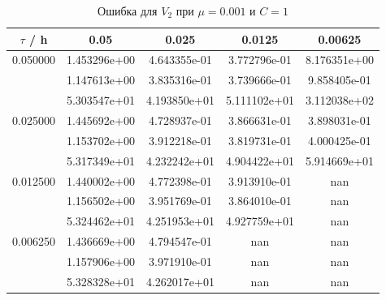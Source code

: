 \documentclass[specialist,subf,href,colorlinks=true,12pt
,times,mtpro,specialist
]{disser}
\begin{document}
\begin{table}[H]
\small
\caption{Ошибка для $V_2$ при $\mu=0.001$ и $C = 1$}
\begin{center}
\begin{tabular}{|c|c|c|c|c|}
\hline
$\tau$ / h & 0.05 & 0.025 & 0.0125 & 0.00625 \\
\hline
0.050000 & 1.453296e+00  & 4.643355e-01  & 3.772796e-01  & 8.176351e+00 \\
 & 1.147613e+00  & 3.835316e-01  & 3.739666e-01  & 9.858405e-01 \\
 & 5.303547e+01  & 4.193850e+01  & 5.111102e+01  & 3.112038e+02 \\
\hline
0.025000 & 1.445692e+00  & 4.728937e-01  & 3.866631e-01  & 3.898031e-01 \\
 & 1.153702e+00  & 3.912218e-01  & 3.819731e-01  & 4.000425e-01 \\
 & 5.317349e+01  & 4.232242e+01  & 4.904422e+01  & 5.914669e+01 \\
\hline
0.012500 & 1.440002e+00  & 4.772398e-01  & 3.913910e-01  & nan \\
 & 1.156502e+00  & 3.951769e-01  & 3.864010e-01  & nan \\
 & 5.324462e+01  & 4.251953e+01  & 4.927759e+01  & nan \\
\hline
0.006250 & 1.436669e+00  & 4.794547e-01  & nan  & nan \\
 & 1.157906e+00  & 3.971910e-01  & nan  & nan \\
 & 5.328328e+01  & 4.262017e+01  & nan  & nan \\
\hline
\end{tabular}
\end{center}
\end{table}
\end{document}
